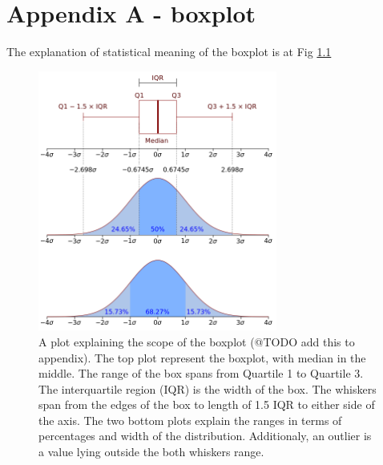 \chapter{Appendix A - boxplot}

The explanation of statistical meaning of the boxplot is at Fig \ref{fig:boxplot}
\label{AppendixA}

\begin{figure}[H]
\centering
\includegraphics[width=0.7\textwidth]{figures/chapter4/surrogates/Boxplot_vs_PDF.png}
\caption{A plot explaining the scope of the boxplot (@TODO add this to appendix). The top plot represent the boxplot, with median in the middle. The range of the box spans from Quartile 1 to Quartile 3. The interquartile region (IQR) is the width of the box. The whiskers span from the edges of the box to length of 1.5 IQR to either side of the axis.
  The two bottom plots explain the ranges in terms of percentages and width of the distribution. Additionaly, an outlier is a value lying outside the both whiskers range. }
\label{fig:boxplot}
\end{figure}
